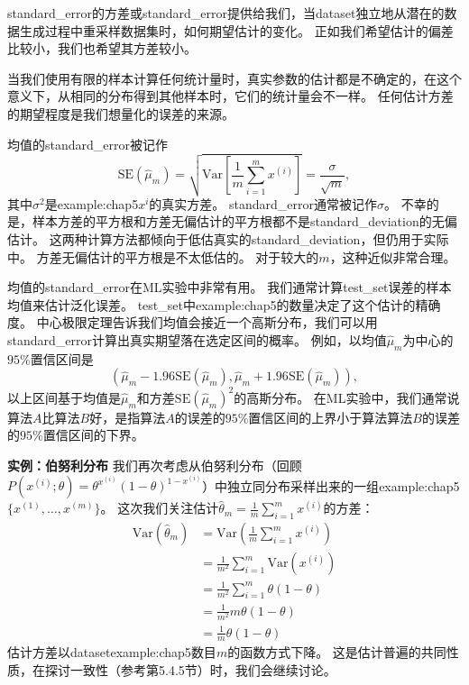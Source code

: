 \gls{standard_error}的方差或\gls{standard_error}提供给我们，当\gls{dataset}独立地从潜在的数据生成过程中重采样数据集时，如何期望估计的变化。
正如我们希望估计的偏差比较小，我们也希望其方差较小。

当我们使用有限的样本计算任何统计量时，真实参数的估计都是不确定的，在这个意义下，从相同的分布得到其他样本时，它们的统计量会不一样。
任何估计方差的期望程度是我们想量化的误差的来源。

均值的\gls{standard_error}被记作
\begin{equation}
\label{eq:5.46}
    \text{SE}(\hat{\mu}_m) = \sqrt{ \text{Var}[ \frac{1}{m} \sum_{i=1}^m x^{(i)} ] } = \frac{\sigma}{\sqrt{m}},
\end{equation}
其中$\sigma^2$是\gls{example:chap5}$x^i$的真实方差。
\gls{standard_error}通常被记作$\sigma$。
不幸的是，样本方差的平方根和方差无偏估计的平方根都不是\gls{standard_deviation}的无偏估计。
这两种计算方法都倾向于低估真实的\gls{standard_deviation}，但仍用于实际中。
方差无偏估计的平方根是不太低估的。
对于较大的$m$，这种近似非常合理。


均值的\gls{standard_error}在\gls{ML}实验中非常有用。
我们通常计算\gls{test_set}误差的样本均值来估计泛化误差。
\gls{test_set}中\gls{example:chap5}的数量决定了这个估计的精确度。
中心极限定理告诉我们均值会接近一个高斯分布，我们可以用\gls{standard_error}计算出真实期望落在选定区间的概率。
例如，以均值$\hat{\mu}_m$为中心的$95\%$置信区间是
\begin{equation}
    ( \hat{\mu}_m - 1.96\text{SE}(\hat{\mu}_m), \hat{\mu}_m + 1.96 \text{SE}(\hat{\mu}_m) ),
\end{equation}
以上区间基于均值是$\hat{\mu}_m$和方差$\text{SE}(\hat{\mu}_m)^2$的高斯分布。
在\gls{ML}实验中，我们通常说算法$A$比算法$B$好，是指算法$A$的误差的$95\%$置信区间的上界小于算法算法$B$的误差的$95\%$置信区间的下界。

\textbf{实例：伯努利分布} \quad 我们再次考虑从伯努利分布（回顾$P(x^{(i)}; \theta) = \theta^{x^{(i)}} (1-\theta)^{1 - x^{(i)}}$）中独立同分布采样出来的一组\gls{example:chap5}$\{ x^{(1)}, …, x^{(m)} \}$。
这次我们关注估计$\hat{\theta}_m = \frac{1}{m} \sum_{i=1}^m x^{(i)}$的方差：
\begin{align}
    \text{Var}\left( \hat{\theta}_m \right) &= \text{Var}\left( \frac{1}{m} \sum_{i=1}^m x^{(i)} \right) \\
    &= \frac{1}{m^2} \sum_{i=1}^m \text{Var} \left( x^{(i)} \right) \\
    &= \frac{1}{m^2} \sum_{i=1}^m \theta (1 - \theta) \\
    &= \frac{1}{m^2} m\theta(1-\theta) \\
    &= \frac{1}{m} \theta(1-\theta)
\end{align} 
估计方差以\gls{dataset}\gls{example:chap5}数目$m$的函数方式下降。
这是估计普遍的共同性质，在探讨一致性（参考第5.4.5节）时，我们会继续讨论。

